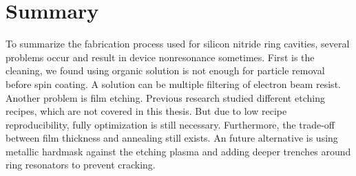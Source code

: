 \newpage
\section{Summary}
To summarize the fabrication process used for silicon nitride ring cavities, several problems occur and result in device nonresonance sometimes. First is the cleaning, we found using organic solution is not enough for particle removal before spin coating. A solution can be multiple filtering of electron beam resist. Another problem is film etching. Previous research \cite{Ono2017} studied different etching recipes, which are not covered in this thesis. But due to low recipe reproducibility, fully optimization is still necessary.
Furthermore, the trade-off between film thickness and annealing still exists. An future alternative is using metallic hardmask against the etching plasma and adding deeper trenches around ring resonators to prevent cracking.


